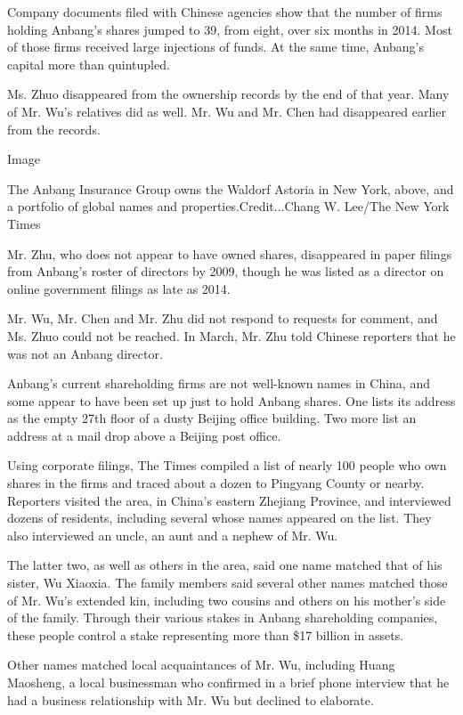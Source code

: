 Company documents filed with Chinese agencies show that the number of
firms holding Anbang's shares jumped to 39, from eight, over six months
in 2014. Most of those firms received large injections of funds. At the
same time, Anbang's capital more than quintupled.

Ms. Zhuo disappeared from the ownership records by the end of that year.
Many of Mr. Wu's relatives did as well. Mr. Wu and Mr. Chen had
disappeared earlier from the records.

Image

The Anbang Insurance Group owns the Waldorf Astoria in New York, above,
and a portfolio of global names and properties.Credit...Chang W. Lee/The
New York Times

Mr. Zhu, who does not appear to have owned shares, disappeared in paper
filings from Anbang's roster of directors by 2009, though he was listed
as a director on online government filings as late as 2014.

Mr. Wu, Mr. Chen and Mr. Zhu did not respond to requests for comment,
and Ms. Zhuo could not be reached. In March, Mr. Zhu told Chinese
reporters that he was not an Anbang director.

Anbang's current shareholding firms are not well-known names in China,
and some appear to have been set up just to hold Anbang shares. One
lists its address as the empty 27th floor of a dusty Beijing office
building. Two more list an address at a mail drop above a Beijing post
office.

Using corporate filings, The Times compiled a list of nearly 100 people
who own shares in the firms and traced about a dozen to Pingyang County
or nearby. Reporters visited the area, in China's eastern Zhejiang
Province, and interviewed dozens of residents, including several whose
names appeared on the list. They also interviewed an uncle, an aunt and
a nephew of Mr. Wu.

The latter two, as well as others in the area, said one name matched
that of his sister, Wu Xiaoxia. The family members said several other
names matched those of Mr. Wu's extended kin, including two cousins and
others on his mother's side of the family. Through their various stakes
in Anbang shareholding companies, these people control a stake
representing more than \$17 billion in assets.

Other names matched local acquaintances of Mr. Wu, including Huang
Maosheng, a local businessman who confirmed in a brief phone interview
that he had a business relationship with Mr. Wu but declined to
elaborate.

